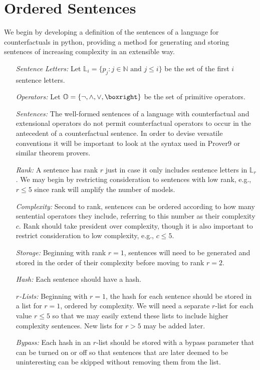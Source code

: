 \documentclass[a4paper, 11pt]{article} %
\newcommand{\set}[1]{\lbrace#1\rbrace} %
\renewcommand{\L}[0]{\mathbb{L}}
\newcommand{\N}[0]{\mathbb{N}}
\renewcommand{\O}[0]{\mathbb{O}}
\begin{document}
\section{Ordered Sentences}

We begin by developing a definition of the sentences of a language for counterfactuals in python, providing a method for generating and storing sentences of increasing complexity in an extensible way.

\begin{enumerate}
  \item[\it Sentence Letters:] Let $\L_i=\set{p_j:j\in\N \text{ and } j\leq i}$ be the set of the first $i$ sentence letters. 
  \item[\it Operators:] Let $\O=\set{\neg,\wedge,\vee,\boxright}$ be the set of primitive operators. 
  \item[\it Sentences:] The well-formed sentences of a language with counterfactual and extensional operators do not permit counterfactual operators to occur in the antecedent of a counterfactual sentence. In order to devise versatile conventions it will be important to look at the syntax used in Prover9 or similar theorem provers.
  \item[\it Rank:] A sentence has rank $r$ just in case it only includes sentence letters in $\L_r$. We may begin by restricting consideration to sentences with low rank, e.g., $r\leq5$ since rank will amplify the number of models.
  \item[\it Complexity:] Second to rank, sentences can be ordered according to how many sentential operators they include, referring to this number as their complexity $c$. Rank should take president over complexity, though it is also important to restrict consideration to low complexity, e.g., $c\leq5$.
  \item[\it Storage:] Beginning with rank $r=1$, sentences will need to be generated and stored in the order of their complexity before moving to rank $r=2$.
  \item[\it Hash:] Each sentence should have a hash.
  \item[\it $r$-Lists:] Beginning with $r=1$, the hash for each sentence should be stored in a list for $r=1$, ordered by complexity. We will need a separate $r$-list for each value $r\leq 5$ so that we may easily extend these lists to include higher complexity sentences. New lists for $r>5$ may be added later. 
  \item[\it Bypass:] Each hash in an $r$-list should be stored with a bypass parameter that can be turned on or off so that sentences that are later deemed to be uninteresting can be skipped without removing them from the list.

\end{enumerate}
\end{document}

